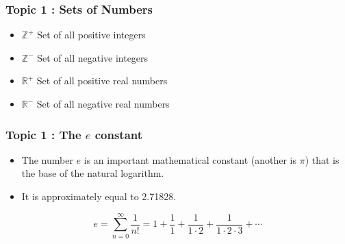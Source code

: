 \documentclass{beamer}
\begin{document}
\begin{frame}
	\frametitle{Topic 1 : Sets of Numbers}
\large	\begin{itemize}
		\item $\mathbb{Z}^{+}$ Set of all positive integers
		\item $\mathbb{Z}^{-}$ Set of all negative integers
		\item $\mathbb{R}^{+}$ Set of all positive real numbers
		\item $\mathbb{R}^{-}$ Set of all negative real numbers
	\end{itemize}
\end{frame}


\begin{frame}
\frametitle{Topic 1 : The $e$ constant}
\large
\begin{itemize}
\item The number $e$ is an important mathematical constant (another is $\pi$) that is the base of the natural logarithm. 
\item It is approximately equal to 2.71828.
\end{itemize}
\bigskip
\[e =  \displaystyle\sum\limits_{n = 0}^{ \infty} \dfrac{1}{n!} = 1 + \frac{1}{1} + \frac{1}{1\cdot 2} + \frac{1}{1\cdot 2\cdot 3} + \cdots  \]
\end{frame}

\end{document}
